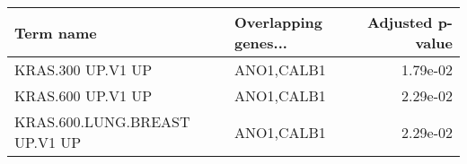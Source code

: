 \begin{tabular}{llr}
\toprule
                    Term name & Overlapping genes... &  Adjusted p-value \\
\midrule
            KRAS.300 UP.V1 UP &           ANO1,CALB1 &          1.79e-02 \\
            KRAS.600 UP.V1 UP &           ANO1,CALB1 &          2.29e-02 \\
KRAS.600.LUNG.BREAST UP.V1 UP &           ANO1,CALB1 &          2.29e-02 \\
\bottomrule
\end{tabular}
